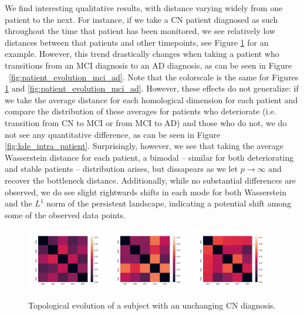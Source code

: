 \documentclass{article}
\begin{document}
We find interesting qualitative results, with distance varying widely from one patient to the next. For instance, if we take a CN patient diagnosed as such throughout the time that patient has been monitored, we see relatively low distances between that patients and other timepoints, see Figure \ref{fig:patient_evolution_stable} for an example. However, this trend drastically changes when taking a patient who transitions from an MCI diagnosis to an AD diagnosis, as can be seen in Figure ~\ref{fig:patient_evolution_mci_ad}. Note that the colorscale is the same for Figures \ref{fig:patient_evolution_stable} and \ref{fig:patient_evolution_mci_ad}. However, these effects do not generalize: if we take the average distance for each homological dimension for each patient and compare the distribution of these averages for patients who deteriorate (i.e. transition from CN to MCI or from MCI to AD) and those who do not, we do not see any quantitative difference, as can be seen in Figure \ref{fig:kde_intra_patient}. Surprisingly, however, we see that taking the average Wasserstein distance for each patient, a bimodal -- similar for both deteriorating and stable patients -- distribution arises, but dissapears as we let $p\to\infty$ and recover the bottleneck distance. Additionally, while no substantial differences are observed, we do see slight rightwards shifts in each mode for both Wasserstein and the $L^1$ norm of the persistent landscape, indicating a potential shift among some of the observed data points.


\begin{figure}
  \centering
  \includegraphics[width=0.32\textwidth]{figures/temporal_evolution/ADNI011S0023_h_0.png}
  \hfill \includegraphics[width=0.32\textwidth]{figures/temporal_evolution/ADNI011S0023_h_1.png}
  \hfill \includegraphics[width=0.32\textwidth]{figures/temporal_evolution/ADNI011S0023_h_2.png} \caption{Topological evolution of a subject with an unchanging CN diagnosis.}
  \label{fig:patient_evolution_stable}
\end{figure}
\end{document}
